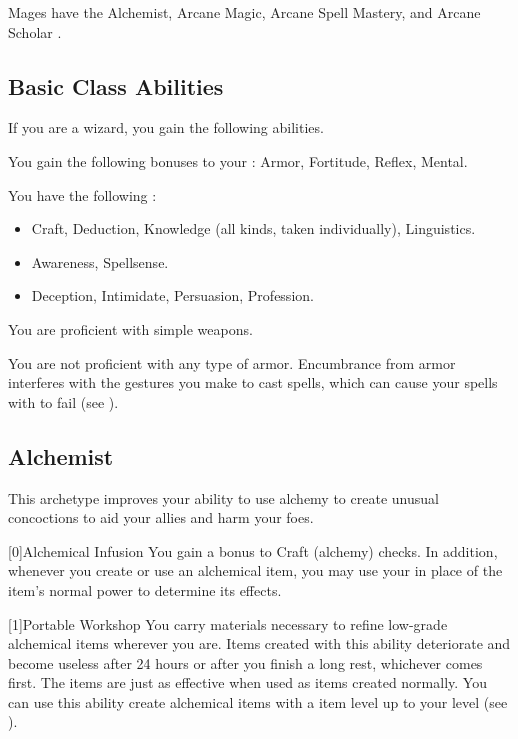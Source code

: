      Mages have the Alchemist, Arcane Magic, Arcane Spell Mastery, and Arcane Scholar .

    \subsection{Basic Class Abilities}
        If you are a wizard, you gain the following abilities.

        You gain the following bonuses to your :  Armor,  Fortitude,  Reflex,  Mental.

        You have the following :
        \begin{itemize}
            \item {} Craft, Deduction, Knowledge (all kinds, taken individually), Linguistics.
            \item {} Awareness, Spellsense.
            \item {} Deception, Intimidate, Persuasion, Profession.
        \end{itemize}

        You are proficient with simple weapons.

        You are not proficient with any type of armor.
        Encumbrance from armor interferes with the gestures you make to cast spells, which can cause your spells with  to fail (see ).

    \newpage
    \subsection{Alchemist}
        This archetype improves your ability to use alchemy to create unusual concoctions to aid your allies and harm your foes.

        [0]{Alchemical Infusion} You gain a  bonus to Craft (alchemy) checks.
        In addition, whenever you create or use an alchemical item, you may use your   in place of the item's normal power to determine its effects.

        [1]{Portable Workshop} 
        You carry materials necessary to refine low-grade alchemical items wherever you are.
        Items created with this ability deteriorate and become useless after 24 hours or after you finish a long rest, whichever comes first.
        The items are just as effective when used as items created normally.
        You can use this ability create alchemical items with a item level up to your level (see ).

